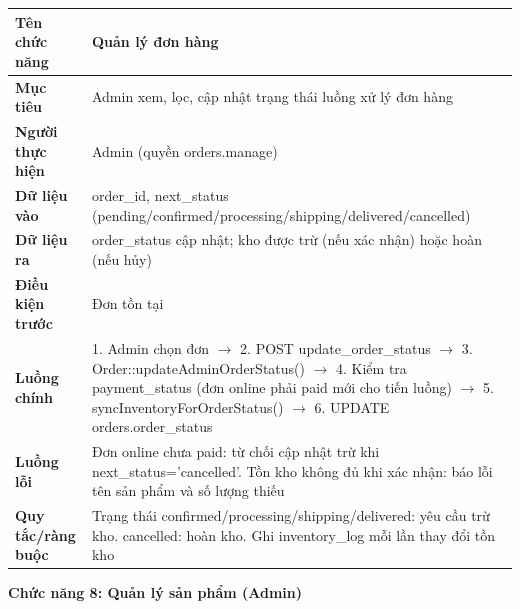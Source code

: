 \documentclass[a4paper]{article}
\begin{document}
\begin{longtable}{|p{3.5cm}|p{10.5cm}|}
\hline
\textbf{Tên chức năng} & Quản lý đơn hàng \\
\hline
\textbf{Mục tiêu} & Admin xem, lọc, cập nhật trạng thái luồng xử lý đơn hàng \\
\hline
\textbf{Người thực hiện} & Admin (quyền orders.manage) \\
\hline
\textbf{Dữ liệu vào} & order\_id, next\_status (pending/confirmed/processing/shipping/delivered/cancelled) \\
\hline
\textbf{Dữ liệu ra} & order\_status cập nhật; kho được trừ (nếu xác nhận) hoặc hoàn (nếu hủy) \\
\hline
\textbf{Điều kiện trước} & Đơn tồn tại \\
\hline
\textbf{Luồng chính} & 1. Admin chọn đơn $\to$ 2. POST update\_order\_status $\to$ 3. Order::updateAdminOrderStatus() $\to$ 4. Kiểm tra payment\_status (đơn online phải paid mới cho tiến luồng) $\to$ 5. syncInventoryForOrderStatus() $\to$ 6. UPDATE orders.order\_status \\
\hline
\textbf{Luồng lỗi} & Đơn online chưa paid: từ chối cập nhật trừ khi next\_status='cancelled'. Tồn kho không đủ khi xác nhận: báo lỗi tên sản phẩm và số lượng thiếu \\
\hline
\textbf{Quy tắc/ràng buộc} & Trạng thái confirmed/processing/shipping/delivered: yêu cầu trừ kho. cancelled: hoàn kho. Ghi inventory\_log mỗi lần thay đổi tồn kho \\
\hline
\end{longtable}

\vspace{0.5cm}
\noindent\textbf{Chức năng 8: Quản lý sản phẩm (Admin)}
\end{document}
